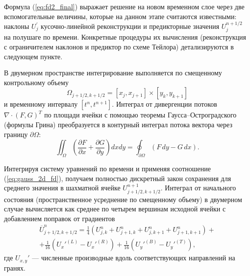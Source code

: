 \documentclass[a4paper,14pt]{extarticle}
\theoremstyle{theorem}
\theoremstyle{lemma}
\begin{document}
Формула (\ref{eq:fd2_final}) выражает решение на новом временном слое через две вспомогательные величины, которые на данном этапе считаются известными: наклоны $U_j^\prime$ кусочно-линейной реконструкции и предикторные значения $U_j^{n+1/2}$ на полушаге по времени. Конкретные процедуры их вычисления (реконструкция с ограничителем наклонов и предиктор по схеме Тейлора) детализируются в следующем пункте.


В двумерном пространстве интегрирование выполняется по смещенному контрольному объему 
{%
    \setlength{\abovedisplayskip}{8pt plus 2pt minus 2pt}%
    \setlength{\belowdisplayskip}{8pt plus 2pt minus 2pt}%
    \setlength{\abovedisplayshortskip}{0pt plus 2pt}%
    \setlength{\belowdisplayshortskip}{2pt plus 2pt minus 2pt}%
\begin{equation}
    \Omega_{j+1/2, k+1/2} = [x_j, x_{j+1}] \times [y_k, y_{k+1}]
\end{equation}}
и временному интервалу $[t^n, t^{n+1}]$. Интеграл от дивергенции потоков $\nabla \cdot (F, G)^T$ по площади ячейки с помощью теоремы Гаусса--Остроградского (формулы Грина) преобразуется в контурный интеграл потока вектора через границу $\partial \Omega$:
\begin{equation}
\label{eq:gauss_2d_fd}
\iint_{\Omega} \left( \frac{\partial F}{\partial x} + \frac{\partial G}{\partial y} \right) dx dy = \oint_{\partial \Omega} \left( F \, dy - G \, dx \right).
\end{equation}

Интегрируя систему уравнений по времени и применяя соотношение (\ref{eq:gauss_2d_fd}), получаем полностью дискретный закон сохранения для среднего значения в шахматной ячейке $U_{j+1/2, k+1/2}^{n+1}$. Интеграл от начального состояния (пространственное усреднение по смещенному объему) в двумерном случае вычисляется как среднее по четырем вершинам исходной ячейки с добавлением поправок от градиентов
\begin{equation}
\label{eq:spatial_avg_2d}
\begin{gathered}
\overline{U}_{j+1/2, k+1/2}^n = \frac{1}{4} \left( U_{j,k}^n + U_{j+1,k}^n + U_{j,k+1}^n + U_{j+1,k+1}^n \right) + \\
+ \frac{1}{16} \left( U_x'^{(L)} - U_x'^{(R)} \right) + \frac{1}{16} \left( U_y'^{(B)} - U_y'^{(T)} \right),
\end{gathered}
\end{equation}
где $U_{x,y}'$ — численные производные вдоль соответствующих направлений на гранях. 
\end{document}
